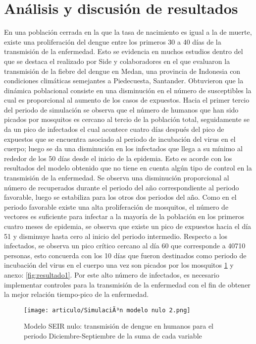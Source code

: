 \documentclass[journal]{IEEEtran}
\begin{document}
\section{Análisis y discusión de resultados}

En una población cerrada en la que la tasa de nacimiento es igual a la de muerte, existe una proliferación del dengue entre los primeros 30 a 40 días de la transmisión de la enfermedad. Esto se evidencia en muchos estudios dentro del que se destaca el realizado por Side y colaboradores \cite{medan} en el que evaluaron la transmisión de la fiebre del dengue en Medan, una provincia de Indonesia con condiciones climáticas semejantes a Piedecuesta, Santander. Obtuvieron que la dinámica poblacional consiste en una disminución en el número de susceptibles la cual es proporcional al aumento de los casos de expuestos. Hacia el primer tercio del periodo de simulación se observa que el número de humanos que han sido picados por mosquitos es cercano al tercio de la población total, seguidamente se da un pico de infectados el cual acontece cuatro días después del pico de expuestos que se encuentra asociado al periodo de incubación del virus en el cuerpo; luego se da una disminución en los infectados que llega a su mínimo al rededor de los 50 días desde el inicio de la epidemia. Esto es acorde con los resultados del modelo obtenido que no tiene en cuenta algún tipo de control en la transmisión de la enfermedad. Se observa una disminución proporcional al número de recuperados durante el periodo del año correspondiente al periodo favorable, luego se estabiliza para los otros dos periodos del año. Como en el periodo favorable existe una alta proliferación de mosquitos, el número de vectores es suficiente para infectar a la mayoría de la población en los primeros cuatro meses de epidemia, se observa que existe un pico de expuestos hacia el día 51 y disminuye hasta cero al inicio del periodo intermedio. Respecto a los infectados, se observa un pico crítico cercano al día 60 que corresponde a 40710 personas, esto concuerda con los 10 días que fueron destinados como periodo de incubación del virus en el cuerpo una vez son picados por los mosquitos \ref{fig:resultado2} y anexo: \ref{fig:resultado1}. Por este alto número de infectados, es necesario implementar controles para la transmisión de la enfermedad con el fin de obtener la mejor relación tiempo-pico de la enfermedad.


\begin{figure}[H]
\centering
\texttt{[image: articulo/SimulaciÃ³n modelo nulo 2.png]}
\caption{Modelo SEIR nulo: transmisión de dengue en humanos para el periodo Diciembre-Septiembre de la suma de cada variable}
\label{fig:resultado2}
\centering
\end{figure}
\end{document}

